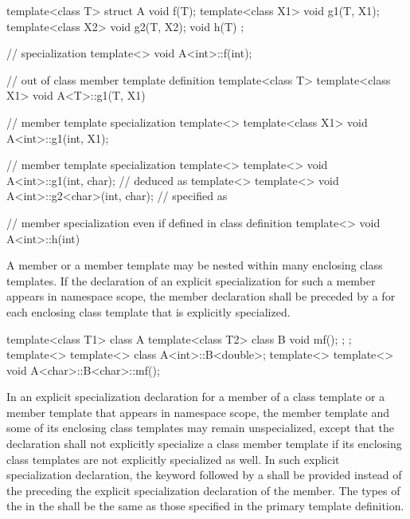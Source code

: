 \begin{codeblock}
template<class T> struct A {
	void f(T);
	template<class X1> void g1(T, X1);
	template<class X2> void g2(T, X2);
	void h(T) { }
};

// specialization
template<> void A<int>::f(int);

// out of class member template definition
template<class T> template<class X1> void A<T>::g1(T, X1) { }

// member template specialization
template<> template<class X1> void A<int>::g1(int, X1);

// member template specialization
template<> template<>
	void A<int>::g1(int, char);     //  deduced as 
template<> template<>
	void A<int>::g2<char>(int, char); //  specified as 

// member specialization even if defined in class definition
template<> void A<int>::h(int) { }
\end{codeblock}
\exitexampleb

\pnum
A member or a member template may be nested within many enclosing class
templates.
If the declaration of an explicit specialization for such a member
appears in namespace scope, the member declaration shall be preceded by a
for each enclosing class template that is explicitly specialized.
\enterexample

\begin{codeblock}
template<class T1> class A {
	template<class T2> class B {
		void mf();
	};
};
template<> template<> class A<int>::B<double>;
template<> template<> void A<char>::B<char>::mf();
\end{codeblock}
\exitexampleb

\pnum
In an explicit specialization declaration for a member of a class template or
a member template that appears in namespace scope,
the member template and some of its enclosing class templates may remain
unspecialized,
except that the declaration shall not explicitly specialize a class member
template if its enclosing class templates are not explicitly specialized
as well.
In such explicit specialization declaration, the keyword
followed by a
shall be provided instead of the
preceding the explicit specialization declaration of the member.
The types of the
in the
shall be the same as those specified in the primary template definition.
\enterexample

